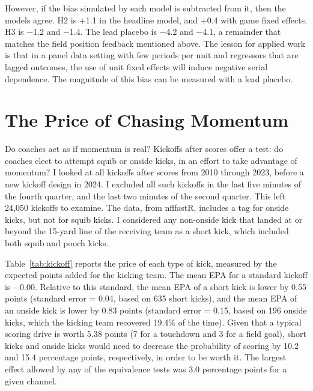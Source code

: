 \documentclass[11pt]{article}
\begin{document}
{\small\setlength{\tabcolsep}{4pt}}

However, if the bias simulated by each model is subtracted from it, then the models agree. H2 is $+$1.1 in the headline model, and $+$0.4 with game fixed effects. H3 is $-$1.2 and $-$1.4. The lead placebo is $-$4.2 and $-$4.1, a remainder that matches the field position feedback mentioned above. The lesson for applied work is that in a panel data setting with few periods per unit and regressors that are lagged outcomes, the use of unit fixed effects will induce negative serial dependence. The magnitude of this bias can be measured with a lead placebo.

\section{The Price of Chasing Momentum}\label{sec:kick}

Do coaches act as if momentum is real? Kickoffs after scores offer a test: do coaches elect to attempt squib or onside kicks, in an effort to take advantage of momentum? I looked at all kickoffs after scores from 2010 through 2023, before a new kickoff design in 2024. I excluded all such kickoffs in the last five minutes of the fourth quarter, and the last two minutes of the second quarter. This left 24,050 kickoffs to examine. The data, from nflfastR, includes a tag for onside kicks, but not for squib kicks. I considered any non-onside kick that landed at or beyond the 15-yard line of the receiving team as a short kick, which included both squib and pooch kicks.

Table~\ref{tab:kickoff} reports the price of each type of kick, measured by the expected points added for the kicking team. The mean EPA for a standard kickoff is $-$0.00. Relative to this standard, the mean EPA of a short kick is lower by 0.55 points (standard error = 0.04, based on 635 short kicks), and the mean EPA of an onside kick is lower by 0.83 points (standard error = 0.15, based on 196 onside kicks, which the kicking team recovered 19.4\% of the time). Given that a typical scoring drive is worth 5.38 points (7 for a touchdown and 3 for a field goal), short kicks and onside kicks would need to decrease the probability of scoring by 10.2 and 15.4 percentage points, respectively, in order to be worth it. The largest effect allowed by any of the equivalence tests was 3.0 percentage points for a given channel.

{\small\setlength{\tabcolsep}{4pt}}
\end{document}
